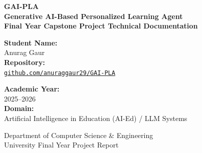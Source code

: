 \documentclass[12pt,a4paper]{article}
\begin{document}
\begin{titlepage}
    \centering
    \vspace*{1.5cm}
    
    {\Huge \textbf{GAI-PLA}}\\[0.4cm]
    {\LARGE \textbf{Generative AI-Based Personalized Learning Agent}}\\[1.2cm]
    
    \textbf{Final Year Capstone Project Technical Documentation}\\[2.5cm]
    
    \begin{minipage}{0.48\textwidth}
        \begin{flushleft} \large
            \textbf{Student Name:}\\
            Anurag Gaur\\
            \vspace{0.3cm}
            \textbf{Repository:}\\
            \href{https://github.com/anuraggaur29/GAI-PLA}{\texttt{github.com/anuraggaur29/GAI-PLA}}
        \end{flushleft}
    \end{minipage}
    \hfill
    \begin{minipage}{0.48\textwidth}
        \begin{flushright} \large
            \textbf{Academic Year:}\\
            2025--2026\\[0.3cm]
            \textbf{Domain:}\\
            Artificial Intelligence in Education (AI-Ed) / LLM Systems
        \end{flushright}
    \end{minipage}
    
    \vfill
    {\large Department of Computer Science \& Engineering}\\[0.2cm]
    {\large University Final Year Project Report}
\end{titlepage}

\tableofcontents
\newpage
\end{document}

